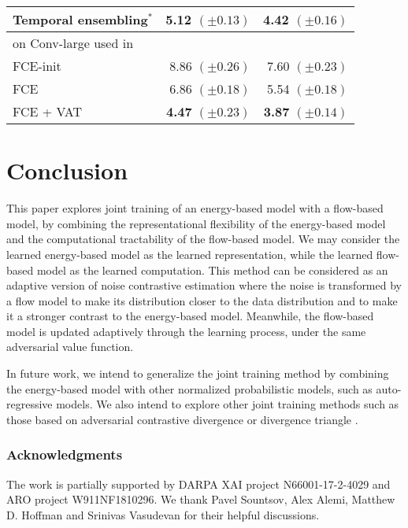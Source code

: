 \documentclass[10pt,twocolumn,letterpaper]{article}
\begin{document}
\begin{table}
\begin{tabular}{lrr}
     Temporal ensembling$^*$ \cite{laine2016temporal} & 5.12 $(\pm 0.13)$ & 4.42 $(\pm 0.16)$ \\ 
      \midrule
     \multicolumn{2}{l}{on Conv-large used in \cite{laine2016temporal, miyato2018virtual}}\\
      FCE-init & 8.86 $(\pm 0.26)$ &  7.60 $(\pm 0.23)$\\
     FCE & { 6.86} $(\pm 0.18)$  & 5.54 $(\pm 0.18)$\\
      FCE + VAT & {\bf 4.47} $(\pm 0.23)$  & {\bf 3.87} $(\pm 0.14)$\\ 
        \bottomrule
    \end{tabular}
    \label{tabl: semi}
\end{table}

\section{Conclusion}
This paper explores joint training of an energy-based model with a flow-based model, by combining the representational flexibility of the energy-based model and the computational tractability of the flow-based model.
We may consider the learned energy-based model as the learned representation, while the learned flow-based model as the learned computation.
This method can be considered as an adaptive version of noise contrastive estimation where the noise is transformed by a flow model to make its distribution closer to the data distribution and to make it a stronger contrast to the energy-based model. Meanwhile, the flow-based model is updated adaptively through the learning process, under the same adversarial value function. 

In future work, we intend to generalize the joint training method by combining the energy-based model with other normalized probabilistic models, such as auto-regressive models. We also intend to explore other joint training methods such as those based on adversarial contrastive divergence \cite{kim2016deep, dai2017calibrating, han2018divergence}  or divergence triangle \cite{han2018divergence}.

\subsubsection*{Acknowledgments}


The work is partially supported by DARPA XAI project N66001-17-2-4029 and ARO project W911NF1810296. We thank Pavel Sountsov, Alex Alemi, Matthew D. Hoffman and Srinivas Vasudevan for their helpful discussions. 
\end{document}
